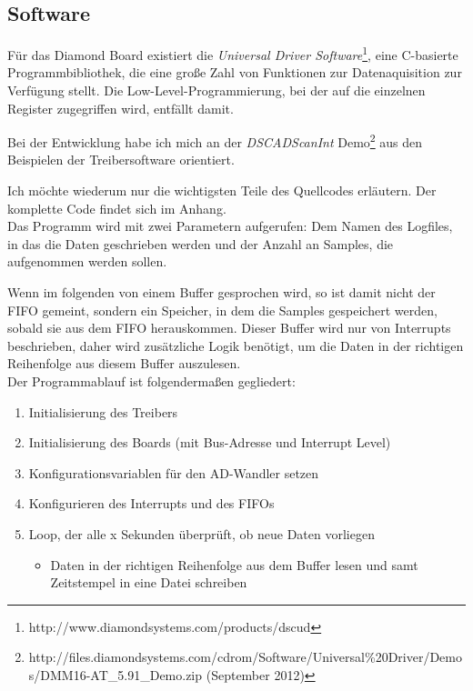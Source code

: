 \documentclass[12pt,a4paper]{scrartcl}
\begin{document}
\subsection{Software}

Für das Diamond Board existiert die \textit{Universal Driver Software}\footnote{http://www.diamondsystems.com/products/dscud}, eine C-basierte Programmbibliothek, die eine große Zahl von Funktionen zur Datenaquisition zur Verfügung stellt. Die Low-Level-Programmierung, bei der auf die einzelnen Register zugegriffen wird, entfällt damit. 

Bei der Entwicklung habe ich mich an der \textit{DSCADScanInt} Demo\footnote{http://files.diamondsystems.com/cdrom/Software/Universal\%20Driver/Demos/DMM16-AT\_5.91\_Demo.zip (September 2012)} aus den Beispielen der Treibersoftware orientiert.

Ich möchte wiederum nur die wichtigsten Teile des Quellcodes erläutern. Der komplette Code findet sich im Anhang. \\

Das Programm wird mit zwei Parametern aufgerufen: Dem Namen des Logfiles, in das die Daten geschrieben werden und der Anzahl an Samples, die aufgenommen werden sollen. 

Wenn im folgenden von einem Buffer gesprochen wird, so ist damit nicht der FIFO gemeint, sondern ein Speicher, in dem die Samples gespeichert werden, sobald sie aus dem FIFO herauskommen. Dieser Buffer wird nur von Interrupts beschrieben, daher wird zusätzliche Logik benötigt, um die Daten in der richtigen Reihenfolge aus diesem Buffer auszulesen. \\

Der Programmablauf ist folgendermaßen gegliedert:

\begin{enumerate}
	\item Initialisierung des Treibers
	\item Initialisierung des Boards (mit Bus-Adresse und Interrupt Level)
	\item Konfigurationsvariablen für den AD-Wandler setzen
	\item Konfigurieren des Interrupts und des FIFOs
	\item Loop, der alle x Sekunden überprüft, ob neue Daten vorliegen
		\begin{itemize}
			\item Daten in der richtigen Reihenfolge aus dem Buffer lesen und samt Zeitstempel in eine Datei schreiben
		\end{itemize}
\end{enumerate}
\end{document}
